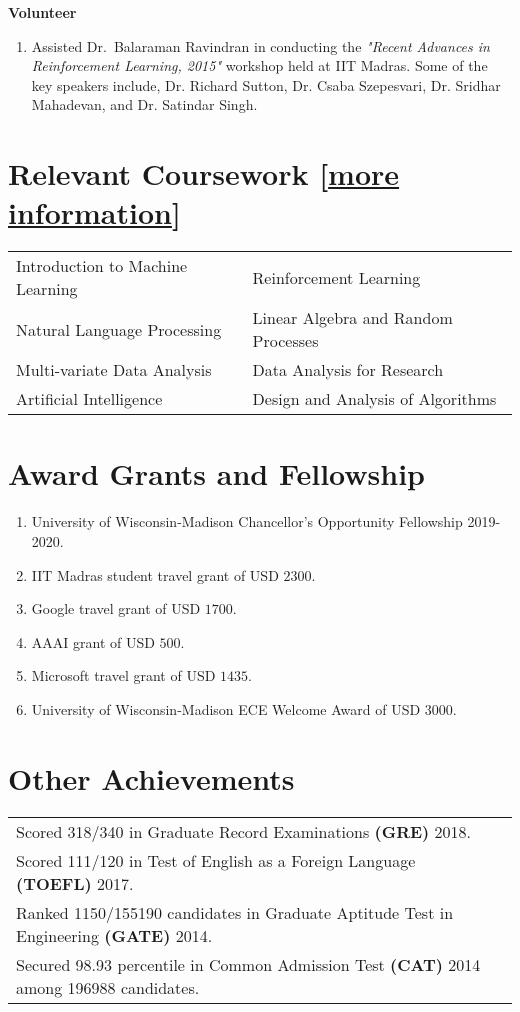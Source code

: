 \documentclass[margin,11pt]{res}
\begin{document}
\begin{resume}
\textbf{Volunteer} 
\begin{enumerate}
\item Assisted Dr.~Balaraman Ravindran in conducting the \textit{"Recent Advances in Reinforcement Learning, 2015"} workshop held at IIT Madras. Some of the key speakers include, Dr. Richard Sutton, Dr. Csaba Szepesvari, Dr. Sridhar Mahadevan, and Dr. Satindar Singh.
\end{enumerate}


\section{Relevant Coursework [\href{https://github.com/Subhojyoti/subhojyoti.github.io/blob/master/pdf/Courses\%20Information.pdf}{more information}]}
\begin{tabular}{ll}
Introduction to Machine Learning & Reinforcement Learning  \\
Natural Language Processing & Linear Algebra and Random Processes \\
Multi-variate Data Analysis & Data Analysis for Research \\
Artificial Intelligence & Design and Analysis of Algorithms \\
\end{tabular}

\section{Award Grants and Fellowship}
\begin{enumerate}
\item University of Wisconsin-Madison Chancellor's Opportunity Fellowship 2019-2020.
\item  IIT Madras student travel grant of USD $2300$.
\item Google travel grant of USD $1700$.
\item AAAI grant of USD $500$.
\item Microsoft travel grant of USD $1435$.
\item University of Wisconsin-Madison ECE Welcome Award of USD $3000$.
\end{enumerate}


\section{Other Achievements}
\begin{tabular}{p{12cm}p{80cm}}
Scored 318/340 in Graduate Record Examinations \textbf{(GRE)} 2018.\\
Scored 111/120 in Test of English as a Foreign Language \textbf{(TOEFL)} 2017.\\
Ranked 1150/155190 candidates in Graduate Aptitude Test in Engineering \textbf{(GATE)} 2014. \\
Secured 98.93 percentile in Common Admission Test \textbf{(CAT)} 2014 among 196988 candidates.
\end{tabular}


\end{resume}
\end{document}
